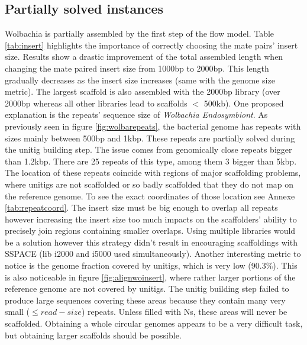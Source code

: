 \documentclass[12pt]{article}
\begin{document}
\subsection{Partially solved instances}\label{sec:wolbachia}
Wolbachia is partially assembled by the first step of the flow model. Table \ref{tab:insert} highlights the importance of correctly choosing the mate pairs' insert size. Results show a drastic improvement of the total assembled length when changing the mate paired insert size from 1000bp to 2000bp. This length gradually decreases as the insert size increases (same with the genome size metric). The largest scaffold is also assembled with the 2000bp library (over 2000bp whereas all other libraries lead to scaffolds $<$ 500kb). One proposed explanation is the repeats' sequence size of \textit{Wolbachia Endosymbiont}. As previously seen in figure \ref{fig:wolbarepeats}, the bacterial genome has repeats with sizes mainly between 500bp and 1kbp. These repeats are partially solved during the unitig building step. The issue comes from genomically close repeats bigger than 1.2kbp. There are 25 repeats of this type, among them 3 bigger than 5kbp. The location of these repeats coincide with regions of major scaffolding problems, where unitigs are not scaffolded or so badly scaffolded that they do not map on the reference genome. To see the exact coordinates of those location see Annexe \ref{tab:repeatcoord}. The insert size must be big enough to overlap all repeats however increasing the insert size too much impacts on the scaffolders' ability to precisely join regions containing smaller overlaps. Using multiple libraries would be a solution however this strategy didn't result in encouraging scaffoldings with SSPACE (lib i2000 and i5000 used simultaneously). Another interesting metric to notice is the genome fraction covered by unitigs, which is very low (90.3\%). This is also noticeable in figure \ref{fig:alignwoinsert}, where rather larger portions of the reference genome are not covered by unitigs. The unitig building step failed to produce large sequences covering these areas because they contain many very small ($\leq read-size$) repeats. Unless filled with Ns, these areas will never be scaffolded. Obtaining a whole circular genomes appears to be a very difficult task, but obtaining larger scaffolds should be possible.
\end{document}
